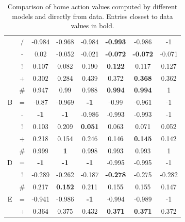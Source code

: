\documentclass{sfuthesis}
\begin{document}
\begin{table}
\begin{tabular}{cc|ccccc|c}
			& {/}                & -0.984             & -0.968              & -0.984            &\textbf{ -0.993}         & -0.986             & -1            \\
			& -                & 0.02               & -0.052              & -0.021            &\textbf{ -0.072}         & \textbf{-0.072}             & -0.071        \\
			& !                & 0.107              & 0.082               & 0.190             & \textbf{0.122}          & 0.117              & 0.127         \\
			& +                & 0.302              & 0.284               & 0.439             & 0.372          & \textbf{0.368}              & 0.362         \\
			& \#               & 0.947              & 0.99                & 0.988             & \textbf{0.994}          & \textbf{0.994}              & 1             \\ \hline
			B              & =                & -0.87              & -0.969              & \textbf{-1}                & -0.99          & -0.961             & -1            \\
			& -                &\textbf{-1}                 & \textbf{-1}                  & -0.986            & -0.993         & -0.993             & -1            \\
			& !                & 0.103              & 0.209               & \textbf{0.051}             & 0.063          & 0.071              & 0.052         \\
			& +                & 0.218              & 0.154               & 0.246             & 0.146          & \textbf{0.145}              & 0.142         \\
			& \#               & 0.999              &\textbf{1}                   & 0.998             & 0.993          & 0.993              & 1             \\ \hline
			D              & =                &\textbf{ -1}                 &\textbf{ -1}                  & \textbf{-1}                & -0.995         & -0.995             & -1            \\
			& !                & -0.289             & -0.262              & -0.187            & \textbf{-0.278}         & -0.275             & -0.282        \\
			& \#               & 0.217              & \textbf{0.152}               & 0.211             & 0.155          & 0.155              & 0.147         \\ \hline
			E              & =                & -0.941             & -0.986              & \textbf{-1}                & -0.994         & -0.989             & -1            \\
			& +                & 0.364              & 0.375               & 0.432             & \textbf{0.371}          & \textbf{0.371}              & 0.372        
		\end{tabular}
		\caption{Comparison of home action values computed by different models and directly from data. Entries closest to data values in bold.}
		\label{tab:qvalues_home}
	\end{table}
	
\end{document}
